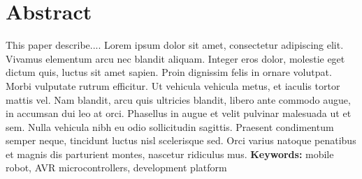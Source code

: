 \chapter*{Abstract}
\indent This paper describe.... Lorem ipsum dolor sit amet, consectetur adipiscing elit. Vivamus elementum arcu nec blandit aliquam. Integer eros dolor, molestie eget dictum quis, luctus sit amet sapien. Proin dignissim felis in ornare volutpat. Morbi vulputate rutrum efficitur. Ut vehicula vehicula metus, et iaculis tortor mattis vel. Nam blandit, arcu quis ultricies blandit, libero ante commodo augue, in accumsan dui leo at orci. Phasellus in augue et velit pulvinar malesuada ut et sem. Nulla vehicula nibh eu odio sollicitudin sagittis. Praesent condimentum semper neque, tincidunt luctus nisl scelerisque sed. Orci varius natoque penatibus et magnis dis parturient montes, nascetur ridiculus mus. 
\vspace{0.5cm}\newline
\textbf{Keywords:} mobile robot, AVR microcontrollers, development platform \vspace{0.5cm}